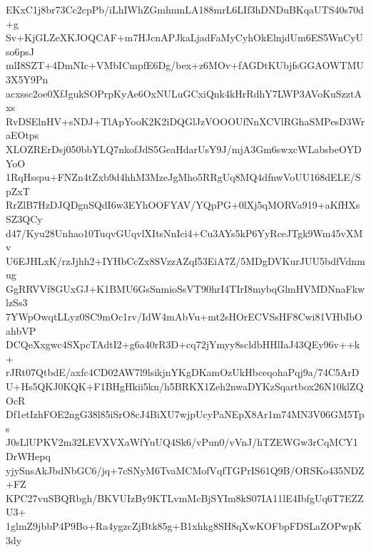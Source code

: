 EKxC1j8br73Cc2cpPb/iLhIWhZGmhnmLA188mrL6LIf3hDNDuBKqaUTS40s70d+g
Sv+KjGLZeXKJOQCAF+m7HJcnAPJkaLjadFaMyCyhOkElnjdUm6ES5WnCyUso6psJ
mlI8SZT+4DmNIc+VMbICmpfE6Dg/bex+z6MOv+fAGDtKUbjfsGGAOWTMU3X5Y9Pn
acxssc2oe0XfJgukSOPrpKyAe6OxNULuGCxiQnk4kHrRdhY7LWP3AVoKuSzztAxs
RvDSElnHV+sNDJ+TlApYooK2K2iDQGlJzVOOOUfNnXCVlRGhaSMPesD3WraEOtps
XLOZRErDsj050bbYLQ7nkofJdS5GeaHdarUsY9J/mjA3Gm6swxcWLabsbeOYDYoO
1RqHsspu+FNZn4tZxb9d4hhM3MzeJgMho5RRgUq8MQ4dfnwVoUU168dELE/SpZxT
RrZlB7HzDJQDgnSQdI6w3EYhOOFYAV/YQpPG+0lXj5qMORVa919+aKfHXsSZ3QCy
d47/Kyu28Unhao10TuqvGUqvlXItsNnIci4+Cu3AYs5kP6YyRceJTgk9Wm45vXMv
U6EJHLxK/rzJjhh2+IYHbCcZx8SVzzAZqf53EiA7Z/5MDgDVKurJUU5bdfVdnmug
GgRRVVf8GUxGJ+K1BMU6GsSnmioSsVT90hrI4TIrI8mybqGlmHVMDNnaFkwlzSs3
7YWpOwqtLLyz0SC9mOc1rv/IdW4mAbVu+mt2sHOrECVSsHF8Cwi81VHbIbOahbVP
DCQeXxgwc4SXpcTAdtI2+g6a40rR3D+cq72jYmyy8scldbHHlIaJ43QEy96v++k+
rJRt07QtbdE/axfc4CD02AW7l9lsikjnYKgDKamOzUkHbceqohaPqj9a/74C5ArD
U+Hs5QKJ0KQK+F1BHgHkii5kn/h5BRKX1Zeh2nwaDYKzSqartbox26N10klZQOcR
Df1etIzhFOE2ngG38l85iSrO8cJ4BiXU7wjpUcyPaNEpX8Ar1m74MN3V06GM5Tps
J0sLlUPKV2m32LEVXVXaWfYuUQ4Sk6/vPun0/vVnJ/hTZEWGw3rCqMCY1DrWHepq
yjySnsAkJbdNbGC6/jq+7cSNyM6TvaMCMofVqfTGPrIS61Q9B/ORSKo435NDZ+FZ
KPC27vuSBQRbgh/BKVUIzBy9KTLvmMcBjSYIm8kS07IA11lE4IbfgUq6T7EZZU3+
1glmZ9jbbP4P9Bo+Ra4ygzcZjBtk85g+B1xhkg8SH8qXwKOFbpFDSLaZOPwpK3dy
